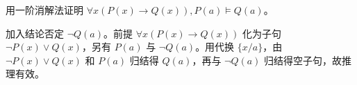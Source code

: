 \begin{exercise}[level=advanced]
用一阶消解法证明 $\forall x(P(x)\to Q(x)), P(a)\vDash Q(a)$。
\begin{solution}
加入结论否定 $\neg Q(a)$。前提 $\forall x(P(x)\to Q(x))$ 化为子句 $\neg P(x)\lor Q(x)$，另有 $P(a)$ 与 $\neg Q(a)$。用代换 $\{x/a\}$，由 $\neg P(x)\lor Q(x)$ 和 $P(a)$ 归结得 $Q(a)$，再与 $\neg Q(a)$ 归结得空子句，故推理有效。
\end{solution}
\end{exercise}

